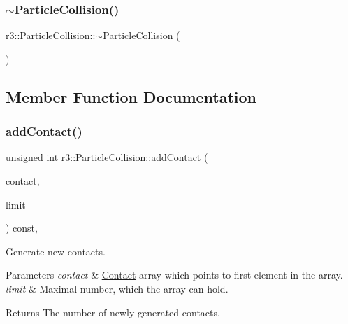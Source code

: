 \subsubsection{\texorpdfstring{$\sim$\+Particle\+Collision()}{~ParticleCollision()}}
{\footnotesize\ttfamily r3\+::\+Particle\+Collision\+::$\sim$\+Particle\+Collision (\begin{DoxyParamCaption}{ }\end{DoxyParamCaption})\hspace{0.3cm}{\ttfamily [default]}}



\subsection{Member Function Documentation}
\mbox{\label{classr3_1_1_particle_collision_ab22f6b1c2d95c925c2dd5241be9b8889}} 
\subsubsection{\texorpdfstring{add\+Contact()}{addContact()}}
{\footnotesize\ttfamily unsigned int r3\+::\+Particle\+Collision\+::add\+Contact (\begin{DoxyParamCaption}\item[{\mbox{\hyperlink{classr3_1_1_particle_contact}{Particle\+Contact}} $\ast$}]{contact,  }\item[{unsigned}]{limit }\end{DoxyParamCaption}) const\hspace{0.3cm}{\ttfamily [override]}, {\ttfamily [virtual]}}



Generate new contacts. 


\begin{DoxyParams}{Parameters}
{\em contact} & \mbox{\hyperlink{classr3_1_1_contact}{Contact}} array which points to first element in the array. \\
\hline
{\em limit} & Maximal number, which the array can hold. \\
\hline
\end{DoxyParams}
\begin{DoxyReturn}{Returns}
The number of newly generated contacts. 
\end{DoxyReturn}


